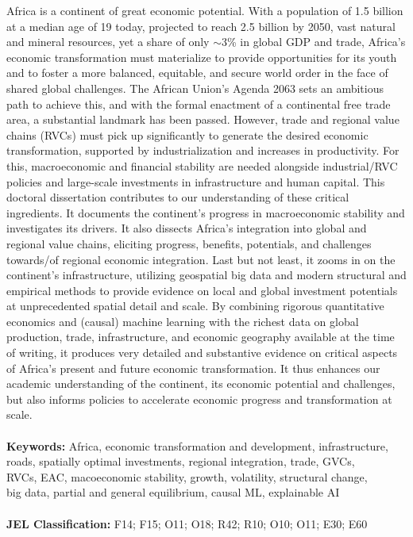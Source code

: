 \documentclass[openany]{book}
\begin{document}
\begin{titlepage}
\begin{center}
        \vspace{0.5cm}
        \begin{minipage}{0.9\textwidth}
            \normalsize
            \hphantom{aa.}Africa is a continent of great economic potential. With a population of 1.5 billion at a median age of 19 today, projected to reach 2.5 billion by 2050, vast natural and mineral resources, yet a share of only $\sim$3\% in global GDP and trade, Africa's economic transformation must materialize to provide opportunities for its youth and to foster a more balanced, equitable, and secure world order in the face of shared global challenges. The African Union's Agenda 2063 sets an ambitious path to achieve this, and with the formal enactment of a continental free trade area, a substantial landmark has been passed. However, trade and regional value chains (RVCs) must pick up significantly to generate the desired economic transformation, supported by industrialization and increases in productivity. For this, macroeconomic and financial stability are needed alongside industrial/RVC policies and large-scale investments in infrastructure and human capital. This doctoral dissertation contributes to our understanding of these critical ingredients. It documents the continent's progress in macroeconomic stability and investigates its drivers. It also dissects Africa's integration into global and regional value chains, eliciting progress, benefits, potentials, and challenges towards/of regional economic integration. Last but not least, it zooms in on the continent's infrastructure, utilizing geospatial big data and modern structural and empirical methods to provide evidence on local and global investment potentials at unprecedented spatial detail and scale. By combining rigorous quantitative economics and (causal) machine learning with the richest data on global production, trade, infrastructure, and economic geography available at the time of writing, it produces very detailed and substantive evidence on critical aspects of Africa's present and future economic transformation. It thus enhances our academic understanding of the continent, its economic potential and challenges, but also informs policies to accelerate economic progress and transformation at scale. \\\\
\noindent \textbf{Keywords:} Africa, economic transformation and development, infrastructure,\\\hphantom{a a a a a a a.}roads, spatially optimal investments, regional integration, trade, GVCs,\\\hphantom{a a a a a a a.}RVCs, EAC, macoeconomic stability, growth, volatility, structural change,\\\hphantom{a a a a a a a.}big data, partial and general equilibrium, causal ML, explainable AI\\\\
\textbf{JEL Classification:} F14; F15; O11; O18; R42; R10; O10; O11; E30; E60
        \end{minipage}
    \end{center}
\end{titlepage}
\end{document}

